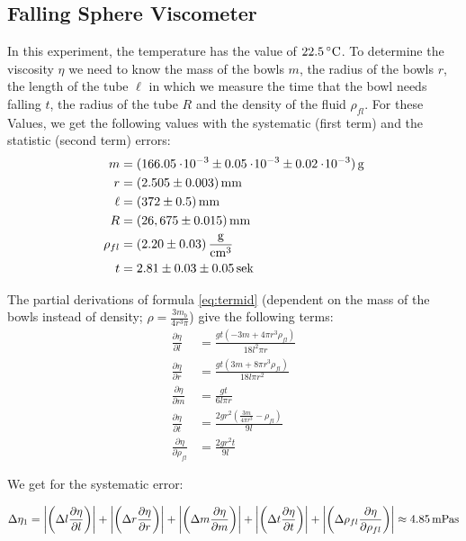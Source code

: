 \subsection{Falling Sphere Viscometer} \label{sec:aufgabe2}
In this experiment, the temperature has the value of $22.5\C$. To determine the viscosity $\eta$ we need to know the mass of the bowls $m$, the radius of the bowls $r$, the length of the tube $\ell$ in which we measure the time that the bowl needs falling $t$, the radius of the tube $R$ and the density of the fluid $\rho_{fl}$. For these Values, we get the following values with the systematic (first term) and the statistic (second term) errors:
\begin{align*}
m &= \unit[(166.05\e{-3} \pm 0.05\e{-3} \pm 0.02 \e{-3})]{g}\\
r &= \unit[(2.505 \pm 0.003)]{mm}\\
\ell &= \unit[(372 \pm 0.5)]{mm}\\
R &= \unit[(26,675 \pm 0.015)]{mm}\\
\rho_{fl} &= \unit[(2.20 \pm 0.03)]{\frac{g}{cm^3}}\\
t &= \unit[2.81 \pm 0.03 \pm 0.05]{sek}
\end{align*}





The partial derivations of formula \ref{eq:termid} (dependent on the mass of the bowls instead of density; $\rho = \frac{3m_b}{4r^3\pi}$) give the following terms:
\begin{align*}
\frac{\partial \eta}{\partial l}  &= \frac{g t \left(-3 m+4 \pi  r^3 \rho_{fl}\right)}{18 l^2 \pi  r}\\
\frac{\partial \eta}{\partial r} &= \frac{g t \left(3 m+8 \pi  r^3 \rho_{fl}\right)}{18 l \pi  r^2}\\
\frac{\partial \eta}{\partial m} &= \frac{g t}{6 l \pi  r}\\
\frac{\partial \eta}{\partial t} &= \frac{2 g r^2 \left(\frac{3 m}{4 \pi  r^3}- \rho_{fl}\right)}{9 l}\\
\frac{\partial \eta}{\partial \rho_{fl}} &= \frac{2 g r^2 t}{9 l}
\end{align*}

We get for the systematic error:

\begin{equation}
\Delta\eta_1 = 
\abs{\left(\Delta l\frac{\partial \eta}{\partial l}\right)}
+
\abs{\left(\Delta r\frac{\partial \eta}{\partial r}\right)}
+
\abs{\left(\Delta m\frac{\partial \eta}{\partial m}\right)}
+
\abs{\left(\Delta t\frac{\partial \eta}{\partial t}\right)}
+
\abs{\left(\Delta \rho_{fl}\frac{\partial \eta}{\partial \rho_{fl}}\right)}
\approx \unit[4.85]{mPa s}
\end{equation}

